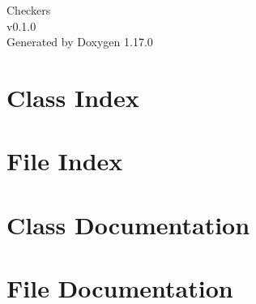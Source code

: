 \documentclass[twoside]{book}
\newcommand{\+}{\discretionary{\mbox{\scriptsize$\hookleftarrow$}}{}{}}
\newcommand{\clearemptydoublepage}{%
    \newpage{\pagestyle{empty}\cleardoublepage}%
  }
\begin{document}
  \raggedbottom
    \hypersetup{pageanchor=false,
                bookmarksnumbered=true,
                pdfencoding=unicode
               }
  \begin{titlepage}
  \vspace*{7cm}
  \begin{center}%
  {\Large Checkers}\\
  [1ex]\large v0.\+1.\+0 \\
  \vspace*{1cm}
  {\large Generated by Doxygen 1.17.0}\\
  \end{center}
  \end{titlepage}
  \clearemptydoublepage
  \tableofcontents
  \clearemptydoublepage
  \hypersetup{pageanchor=true}
\chapter{Class Index}

\chapter{File Index}

\chapter{Class Documentation}



\chapter{File Documentation}

  \backmatter
  \newpage
  \clearemptydoublepage
  \printindex
\end{document}
